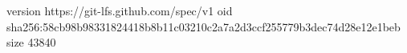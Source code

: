 version https://git-lfs.github.com/spec/v1
oid sha256:58cb98b98331824418b8b11c03210c2a7a2d3ccf255779b3dec74d28e12e1beb
size 43840
